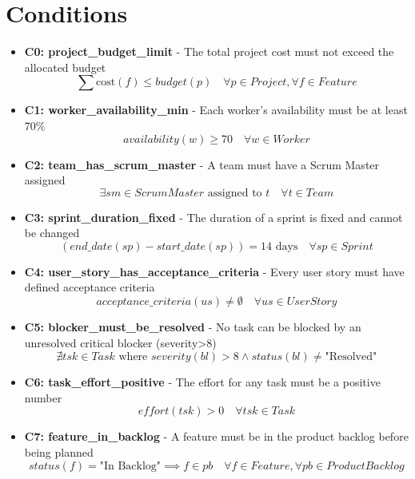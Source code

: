 \documentclass[11pt]{article}
\begin{document}
\section{Conditions}
\begin{itemize}
    \item \textbf{C0: project\_budget\_limit} - The total project cost must not exceed the allocated budget
          \[ \sum \text{cost}(f) \leq budget(p) \quad \forall p \in Project, \forall f \in Feature \]
    \item \textbf{C1: worker\_availability\_min} - Each worker's availability must be at least 70\%
          \[ availability(w) \geq 70 \quad \forall w \in Worker \]
    \item \textbf{C2: team\_has\_scrum\_master} - A team must have a Scrum Master assigned
          \[ \exists sm \in ScrumMaster \text{ assigned to } t \quad \forall t \in Team \]
    \item \textbf{C3: sprint\_duration\_fixed} - The duration of a sprint is fixed and cannot be changed
          \[ (end\_date(sp) - start\_date(sp)) = 14 \text{ days} \quad \forall sp \in Sprint \]
    \item \textbf{C4: user\_story\_has\_acceptance\_criteria} - Every user story must have defined acceptance criteria
          \[ acceptance\_criteria(us) \neq \emptyset \quad \forall us \in UserStory \]
    \item \textbf{C5: blocker\_must\_be\_resolved} - No task can be blocked by an unresolved critical blocker (severity>8)
          \[ \nexists tsk \in Task \text{ where } severity(bl) > 8 \land status(bl) \neq \text{"Resolved"} \]
    \item \textbf{C6: task\_effort\_positive} - The effort for any task must be a positive number
          \[ effort(tsk) > 0 \quad \forall tsk \in Task \]
    \item \textbf{C7: feature\_in\_backlog} - A feature must be in the product backlog before being planned
          \[ status(f) = \text{"In Backlog"} \implies f \in pb \quad \forall f \in Feature, \forall pb \in ProductBacklog \]
\end{itemize}
\end{document}
